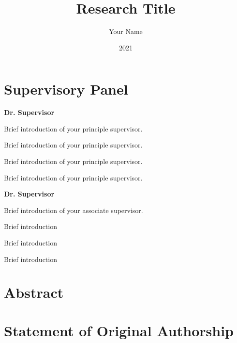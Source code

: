 \documentclass[final]{qutthesis}
\title{\LARGE Research Title}
\author{Your Name}
\date{\large 2021}
\begin{document}
    \frontmatter 
    \maketitle
    \clearpage
    \chapter{Supervisory Panel}
    \normalfont
    
    
    \noindent\textbf{Dr. Supervisor}
    
    \noindent Brief introduction of your principle supervisor.
    
    Brief introduction of your principle supervisor.
    
    Brief introduction of your principle supervisor.
    
    Brief introduction of your principle supervisor.
    
    
    
    \noindent\textbf{Dr. Supervisor}
    
    \noindent Brief introduction of your associate supervisor.
    
    Brief introduction
    
    Brief introduction
    
    Brief introduction
    
    \clearpage
    
    
    \chapter{Abstract}
    \normalfont
    
    \clearpage
    \tableofcontents
    \clearpage
    \listoftables
    \clearpage
    \listoffigures
    \clearpage
    
    \chapter{Statement of Original Authorship}
    
    \clearpage
\end{document}
